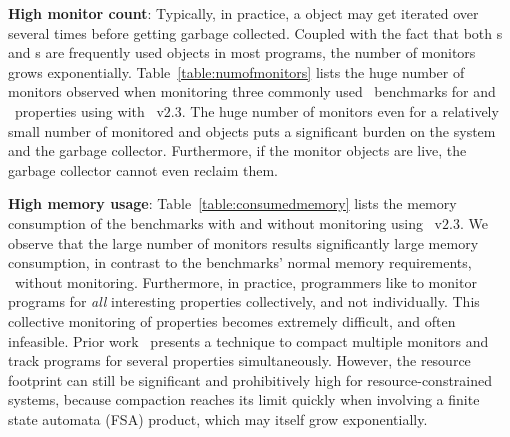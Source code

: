\begin{challenges}
 \item \textbf{High monitor count}: Typically, in practice, a  
object may get iterated over several times before getting garbage collected. 
Coupled with the fact that both s and s are 
frequently used objects in most programs, the number of monitors grows 
exponentially. Table~\ref{table:numofmonitors} lists the huge number of 
monitors observed when monitoring three commonly used \dacapo\ benchmarks 
for  and \unsafeiter\ properties using with \javamop\ 
v$2.3$. The huge number of monitors even for a relatively small number of 
monitored \code{Collection} and \code{Iterator} objects puts a significant 
burden on the system and the garbage collector. Furthermore, if the monitor 
objects are live, the garbage collector cannot even reclaim them.
 
 \item \textbf{High memory usage}: Table~\ref{table:consumedmemory} lists the 
memory consumption of the benchmarks with and without monitoring using 
\javamop\ v$2.3$. We observe that the large number of monitors results 
significantly large memory consumption, in contrast to the benchmarks' normal 
memory requirements, \ie\ without monitoring. Furthermore, in practice, 
programmers like to monitor programs for \textit{all} interesting properties 
collectively, and not individually. This collective monitoring of properties 
becomes extremely difficult, and often infeasible. Prior 
work~\cite{Purandare:2013} presents a technique to compact multiple 
monitors and track programs for several properties simultaneously. However, the 
resource footprint can still be significant and prohibitively high for 
resource-constrained systems, because compaction reaches its limit quickly when 
involving a finite state automata (FSA) product, which may itself grow 
exponentially.


\end{challenges}

